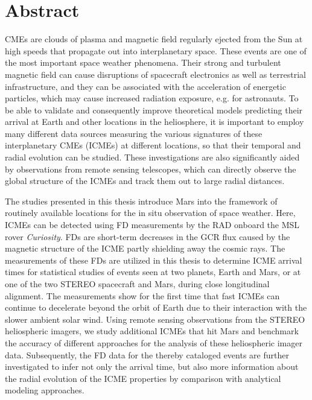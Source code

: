 \chapter*{Abstract}

\Acp{CME} are clouds of plasma and magnetic field regularly ejected from the Sun at high speeds that propagate out into interplanetary space. These events are one of the most important space weather phenomena.
Their strong and turbulent magnetic field can cause disruptions of spacecraft electronics as well as terrestrial infrastructure, and they can be associated with the acceleration of energetic particles, which may cause increased radiation exposure, e.g. for astronauts.
To be able to validate and consequently improve theoretical models predicting their arrival at Earth and other locations in the heliosphere, it is important to employ many different data sources measuring the various signatures of these interplanetary \acp{CME} (\acsp{ICME}) at different locations, so that their temporal and radial evolution can be studied. These investigations are also significantly aided by observations from remote sensing telescopes, which can directly observe the global structure of the \acp{ICME} and track them out to large radial distances.

The studies presented in this thesis introduce Mars into the framework of routinely available locations for the in situ observation of space weather. Here, \acp{ICME} can be detected using \acl{FD} measurements by the \ac{RAD} onboard the \acl{MSL} rover \textit{Curiosity}. \aclp{FD} are short-term decreases in the \acl{GCR} flux caused by the magnetic structure of the \ac{ICME} partly shielding away the cosmic rays.
The measurements of these \aclp{FD} are utilized in this thesis to determine \ac{ICME} arrival times for statistical studies of events seen at two planets, Earth and Mars, or at one of the two \acs{STEREO} spacecraft and Mars, during close longitudinal alignment.
The measurements show for the first time that fast \acp{ICME} can continue to decelerate beyond the orbit of Earth due to their interaction with the slower ambient solar wind.
Using remote sensing observations from the \acs{STEREO} heliospheric imagers, we study additional \acp{ICME} that hit Mars and benchmark the accuracy of different approaches for the analysis of these heliospheric imager data.
Subsequently, the \acl{FD} data for the thereby cataloged events are further investigated to infer not only the arrival time, but also more information about the radial evolution of the \ac{ICME} properties by comparison with analytical modeling approaches.

